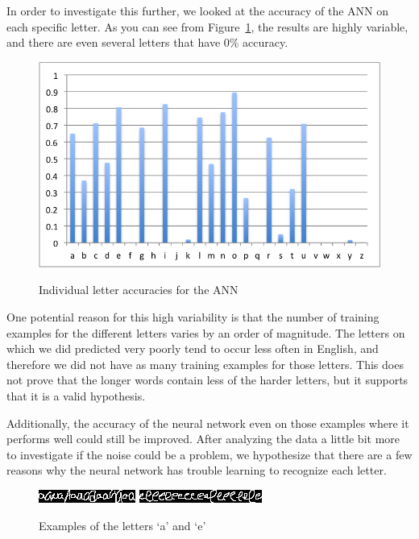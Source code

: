 \documentclass[11pt,letterpaper]{article}
\begin{document}
In order to investigate this further, we looked at the accuracy of the ANN on each specific letter.
As you can see from Figure~\ref{fig:letterAccuracies}, the results are highly variable, and there are even several letters
that have 0\% accuracy.

\begin{figure}[h]
\centering
\caption{Individual letter accuracies for the ANN}
\includegraphics[scale=0.55]{img/letterPercentages.png}
\label{fig:letterAccuracies}
\end{figure} 

One potential reason for this high variability is that the number of training examples for the
different letters varies by an order of magnitude. The letters on which we did predicted very poorly
tend to occur less often in English, and therefore we did not have as many training examples for
those letters. This does not prove that the longer words contain less of the harder letters, but it
supports that it is a valid hypothesis. 

Additionally, the accuracy of the neural network even on those examples where
it performs well could still be improved. After analyzing the data a little bit
more to investigate if the noise could be a problem, we hypothesize that there
are a few reasons why the neural network has trouble learning to recognize each
letter. 

\begin{figure}[h]
\centering
\caption{Examples of the letters `a' and `e'}
\includegraphics[scale=1.0]{img/aa.jpg}
\includegraphics[scale=1.0]{img/ee.jpg}
\label{sampleLetters}
\end{figure}
\end{document}
